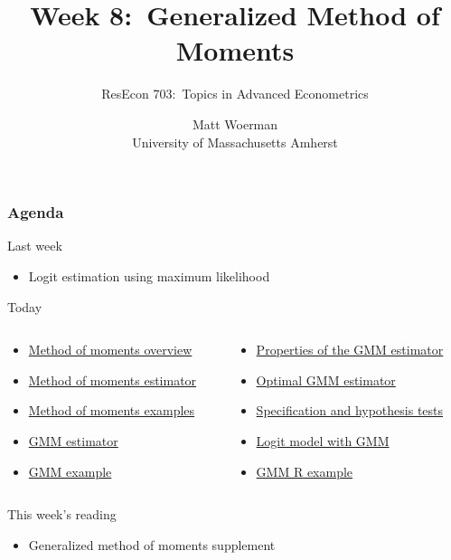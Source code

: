 \documentclass{beamer}\usepackage[]{graphicx}\usepackage[]{color}
\title[Week 8:\ Generalized Method of Moments]{Week 8:\ Generalized Method of Moments}
\author[ResEcon 703:\ Advanced Econometrics]{ResEcon 703:\ Topics in Advanced Econometrics}
\date{Matt Woerman\\University of Massachusetts Amherst}
\begin{document}
{ 
\begin{frame}[noframenumbering]
    \titlepage
\end{frame}
}

\begin{frame}\frametitle{Agenda}
    Last week
    \begin{itemize}
        \item Logit estimation using maximum likelihood
    \end{itemize}
    \vspace{3ex}
    Today
    \begin{columns}
        \begin{column}{0.48\textwidth}
            \begin{itemize}
                \item \hyperlink{page.\getpagerefnumber{overview}}{Method of moments overview}
                \item \hyperlink{page.\getpagerefnumber{mm_est}}{Method of moments estimator}
                \item \hyperlink{page.\getpagerefnumber{mm_ex}}{Method of moments examples}
                \item \hyperlink{page.\getpagerefnumber{gmm_est}}{GMM estimator}
                \item \hyperlink{page.\getpagerefnumber{gmm_ex}}{GMM example}
            \end{itemize}
        \end{column}
        \begin{column}{0.52\textwidth}
            \begin{itemize}
                \item \hyperlink{page.\getpagerefnumber{properties}}{Properties of the GMM estimator}
                \item \hyperlink{page.\getpagerefnumber{optimal}}{Optimal GMM estimator}
                \item \hyperlink{page.\getpagerefnumber{tests}}{Specification and hypothesis tests}
                \item \hyperlink{page.\getpagerefnumber{logit}}{Logit model with GMM}
                \item \hyperlink{page.\getpagerefnumber{example}}{GMM R example}
            \end{itemize}
        \end{column}
    \end{columns}
    \vspace{3ex}
    This week's reading
    \begin{itemize}
        \item Generalized method of moments supplement
    \end{itemize}
\end{frame}
\end{document}
